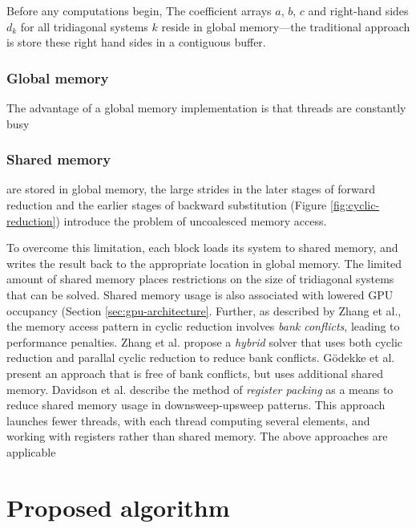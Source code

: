 \documentclass{elsarticle}
\begin{document}
Before any computations begin,
The coefficient arrays $a$, $b$, $c$
and right-hand sides $d_k$
for all tridiagonal systems $k$
reside in global memory---the
traditional approach is store these right hand sides in
a contiguous buffer.

\subsubsection{Global memory}

The advantage of a global memory implementation is that
threads are constantly busy

\subsubsection{Shared memory}



are stored in global memory,
the large strides in the later stages of forward reduction
and the earlier stages of backward substitution
(Figure \ref{fig:cyclic-reduction})
introduce the problem of uncoalesced memory access.

To overcome this limitation,
each block loads its system to shared memory,
and writes the result back to the appropriate location in
global memory.
The limited amount of shared memory places restrictions
on the size of tridiagonal systems that can be solved.
Shared memory usage is also associated with
lowered GPU occupancy (Section \ref{sec:gpu-architecture}.
Further, as described by Zhang et al.,
the memory access pattern in
cyclic reduction involves \emph{bank conflicts},
leading to performance penalties.
Zhang et al. \cite{Zhang2010FTS} propose a
\emph{hybrid} solver
that uses both cyclic reduction and parallal cyclic reduction
to reduce bank conflicts.
G{\"o}dekke et al. \cite{GoSt11CR}
present an approach that is free of bank conflicts,
but uses additional shared memory.
Davidson et al. describe the method of \emph{register packing}
as a means to reduce shared memory usage in
downsweep-upsweep patterns.
This approach launches fewer threads,
with each thread computing several elements,
and working with registers rather than shared memory.
The above approaches are applicable 


\section{Proposed algorithm} \label{sec:proposed-algorithm}
\end{document}
